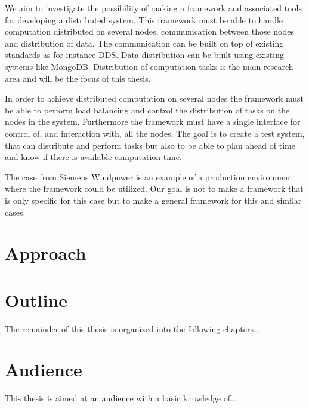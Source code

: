 We aim to investigate the possibility of making a framework and associated tools for developing a distributed system. 
This framework must be able to handle computation distributed on several nodes, communication between those nodes and distribution of data. 
The communication can be built on top of existing standards as for instance DDS. Data distribution can be built using existing systems like MongoDB. 
Distribution of computation tasks is the main research area and will be the focus of this thesis.

In order to achieve distributed computation on several nodes the framework must be able to perform load balancing and control the distribution of tasks on the nodes in the system. 
Furthermore the framework must have a single interface for control of, and interaction with, all the nodes.  
The goal is to create a test system, that can distribute and perform tasks but also to be able to plan ahead of time and know if there is available computation time.

The case from Siemens Windpower is an example of a production environment where the framework could be utilized. 
Our goal is not to make a framework that is only  specific for this case but to make a general framework for this and similar cases.

\section{Approach}

\section{Outline}
The remainder of this thesis is organized into the following chapters...

\section{Audience}
This thesis is aimed at an audience with a basic knowledge of...
